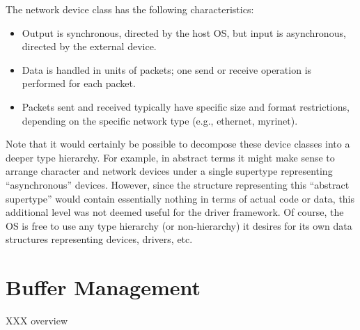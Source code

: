 The network device class has the following characteristics:
\begin{itemize}
\item	Output is synchronous, directed by the host OS,
	but input is asynchronous, directed by the external device.
\item	Data is handled in units of packets;
	one send or receive operation is performed for each packet.
\item	Packets sent and received typically have
	specific size and format restrictions,
	depending on the specific network type (e.g., ethernet, myrinet).
\end{itemize}


Note that it would certainly be possible to decompose these device classes
into a deeper type hierarchy.
For example, in abstract terms it might make sense
to arrange character and network devices
under a single supertype representing ``asynchronous'' devices.
However, since the structure representing this ``abstract supertype''
would contain essentially nothing in terms of actual code or data,
this additional level was not deemed useful for the driver framework.
Of course, the OS is free to use
any type hierarchy (or non-hierarchy) it desires
for its own data structures representing devices, drivers, etc.



\section{Buffer Management}

XXX overview


